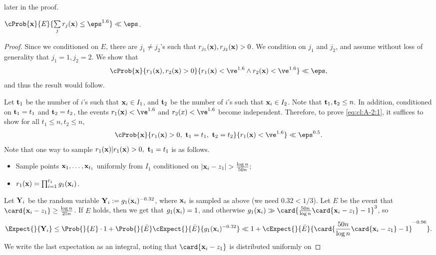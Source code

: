 later in the proof.
\begin{claim}\label{cl:A-2}
  $\cProb{{\bf x}}{E}{\sum\limits_{j} r_j({\bf x}) \leq \eps^{1.6}} \ll \eps$.
\end{claim}
\begin{proof}
Since we conditioned on $E$, there are $j_1\neq j_2$'s such that
$r_{j_1}({\bf x}),r_{j_2}({\bf x}) > 0$. We condition on $j_1$ and $j_2$, and assume without loss of generality that
$j_1 = 1,j_2=2$. We show that
\begin{equation}\label{eq:cl:A-2:1}
\cProb{{\bf x}}{r_1({\bf x}),r_2({\bf x})>0}{r_{1}({\bf x})<\ve^{1.6} \wedge r_{2}({\bf x})<\ve^{1.6}} \ll \eps,
\end{equation}
and thus the result would follow.

Let ${\bf t}_1$ be the number of $i$'s such that ${\bf x}_i\in I_{1}$, and ${\bf t}_2$ be the number of $i$'s such that ${\bf x}_i\in I_{2}$.
Note that ${\bf t}_1, {\bf t}_2 \leq n$.
In addition, conditioned on ${\bf t}_1=t_1$ and ${\bf t}_2=t_2$, the events $r_1({\bf x})<\ve^{1.6}$ and $r_2(x)<\ve^{1.6}$ become independent.
Therefore, to prove \eqref{eq:cl:A-2:1}, it suffices to show for all $t_1\leq n, t_2\leq n$,
  	\begin{equation}
  \cProb{{\bf x}}{r_1({\bf x})>0,~{\bf t}_1=t_1,~{\bf t}_2=t_2}{r_1({\bf x})<\ve^{1.6}}\ll \eps^{0.5}.
  \label{eq:cl:A-2:2}
  \end{equation}
  Note that one way to sample $r_1({\bf x})| r_1({\bf x})>0,~{\bf t}_1=t_1$ is as follows.
  \begin{itemize}
  	\item Sample points ${\bf x}_1,\ldots,{\bf x}_{t_1}$ uniformly from $I_1$ conditioned on $|{\bf x}_i-z_1| > \frac{\log n}{50 n}$;
  	\item
  	$r_1({\bf x}) = \prod_{i=1}^{t_1} g_1({\bf x}_i)$.
  	\end{itemize}
  Let ${\bf Y}_i$ be the random variable ${\bf Y}_i := g_1({\bf x}_i)^{-0.32}$, where
  ${\bf x}_i$ is sampled as above (we need $0.32<1/3$).
  Let $E$ be the event that $\card{{\bf x}_i - z_1}\geq \frac{\log n}{25 n}$.
  If $E$ holds, then we get that $g_1({\bf x}_i) = 1$, and
  otherwise $g_1({\bf x}_i)\gg \card{\frac{50n}{\log n}\card{{\bf x}_i - z_1} - 1}^3$,
  so
  \[
  \Expect{}{{\bf Y}_i}
  \leq \Prob{}{E}\cdot 1 + \Prob{}{\bar{E}}\cExpect{}{\bar{E}}{g_1({\bf x}_i)^{-0.32}}
  \ll 1 + \cExpect{}{\bar{E}}{\card{\frac{50n}{\log n}\card{{\bf x}_i - z_1} - 1}^{-0.96}}.
  \]
  We write the last expectation as an integral, noting that $\card{{\bf x}_i-z_1}$ is distributed uniformly on

\end{proof}
